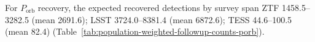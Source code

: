 For $P_\mathrm{orb}$ recovery, the expected recovered detections by survey span ZTF 1458.5--3282.5 (mean 2691.6); LSST 3724.0--8381.4 (mean 6872.6); TESS 44.6--100.5 (mean 82.4) (Table~\ref{tab:population-weighted-followup-counts-porb}).
